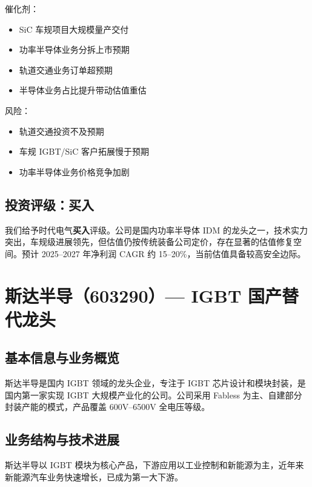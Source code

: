 催化剂：
\begin{itemize}[leftmargin=2em]
\item SiC 车规项目大规模量产交付
\item 功率半导体业务分拆上市预期
\item 轨道交通业务订单超预期
\item 半导体业务占比提升带动估值重估
\end{itemize}

风险：
\begin{itemize}[leftmargin=2em]
\item 轨道交通投资不及预期
\item 车规 IGBT/SiC 客户拓展慢于预期
\item 功率半导体业务价格竞争加剧
\end{itemize}

\subsection{投资评级：买入}

我们给予时代电气\textbf{买入}评级。公司是国内功率半导体 IDM 的龙头之一，技术实力突出，车规级进展领先，但估值仍按传统装备公司定价，存在显著的估值修复空间。预计 2025–2027 年净利润 CAGR 约 15–20\%，当前估值具备较高安全边际。

\section{斯达半导（603290）— IGBT 国产替代龙头}

\subsection{基本信息与业务概览}

斯达半导是国内 IGBT 领域的龙头企业，专注于 IGBT 芯片设计和模块封装，是国内第一家实现 IGBT 大规模产业化的公司。公司采用 Fabless 为主、自建部分封装产能的模式，产品覆盖 600V–6500V 全电压等级。

\subsection{业务结构与技术进展}

斯达半导以 IGBT 模块为核心产品，下游应用以工业控制和新能源为主，近年来新能源汽车业务快速增长，已成为第一大下游。


